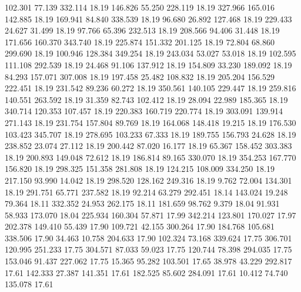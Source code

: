  102.301   77.139  332.114        18.19
 146.826   55.250  228.119        18.19
 327.966  165.016  142.885        18.19
 169.941   84.840  338.539        18.19
  96.680   26.892  127.468        18.19
 229.433   24.627   31.499        18.19
  97.766   65.396  232.513        18.19
 208.566   94.406   31.448        18.19
 171.656  160.370  343.740        18.19
 225.874  151.332  201.125        18.19
  72.804   68.860  299.690        18.19
 100.946  128.384  349.254        18.19
 243.034   53.027   53.018        18.19
 102.595  111.108  292.539        18.19
  24.468   91.106  137.912        18.19
 154.809   33.230  189.092        18.19
  84.293  157.071  307.008        18.19
 197.458   25.482  108.832        18.19
 205.204  156.529  222.451        18.19
 231.542   89.236   60.272        18.19
 350.561  140.105  229.447        18.19
 259.816  140.551  263.592        18.19
  31.359   82.743  102.412        18.19
  28.094   22.989  185.365        18.19
 340.714  120.353  107.457        18.19
 220.383  160.719  220.774        18.19
 303.091  139.914  271.143        18.19
 231.754  157.804   89.769        18.19
 164.068  148.418   19.215        18.19
 176.530  103.423  345.707        18.19
 278.695  103.233   67.333        18.19
 189.755  156.793   24.628        18.19
 238.852   23.074   27.112        18.19
 200.442   87.020   16.177        18.19
  65.367  158.452  303.383        18.19
 200.893  149.048   72.612        18.19
 186.814   89.165  330.070        18.19
 354.253  167.770  156.820        18.19
 298.325  151.358  281.808        18.19
 124.215  108.009  334.250        18.19
 217.150   93.990   14.042        18.19
 298.520  128.162  249.316        18.19
   9.762   72.004  134.301        18.19
 291.751   65.771  237.582        18.19
  92.214   63.279  292.451        18.14
 143.024   19.248   79.364        18.11
 332.352   24.953  262.175        18.11
 181.659   98.762    9.379        18.04
  91.931   58.933  173.070        18.04
 225.934  160.304   57.871        17.99
 342.214  123.801  170.027        17.97
 202.378  149.410   55.439        17.90
 109.721   42.155  300.264        17.90
 184.768  105.681  338.506        17.90
  34.463   10.758  204.633        17.90
 102.324   73.168  339.624        17.75
 306.701  120.995  251.233        17.75
 304.571   87.033   59.023        17.75
 120.744   78.398  294.035        17.75
 153.046   91.437  227.062        17.75
  15.365   95.282  103.501        17.65
  38.978   43.229  292.817        17.61
 142.333   27.387  141.351        17.61
 182.525   85.602  284.091        17.61
  10.412   74.740  135.078        17.61
